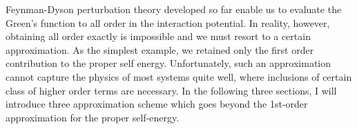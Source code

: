 Feynman-Dyson perturbation theory developed so far enable us to evaluate the Green's function to all order in the interaction potential. In reality, however, obtaining all order exactly is impossible and we must resort to a certain approximation. As the simplest example, we retained only the first order contribution to the proper self energy. Unfortunately, such an approximation cannot capture the physics of most systems quite well, where inclusions of certain class of higher order terms are necessary. In the following three sections, I will introduce three approximation scheme which goes beyond the 1st-order approximation for the proper self-energy. 

